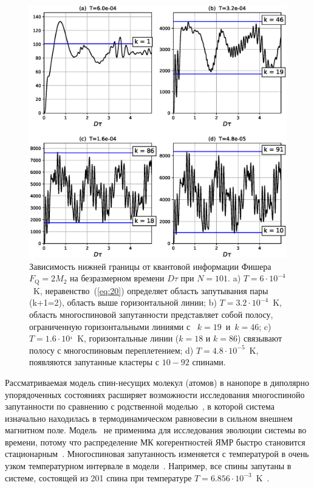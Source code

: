 \documentclass[review]{elsarticle}
\begin{document}
\begin{figure}
  	\includegraphics[width=0.95\linewidth]{fisher_low_bound_n101.eps}
	\caption{
	    Зависимость нижней границы от квантовой информации Фишера $F_\mathrm{Q} = 2 M_{2}$ 
	    на безразмерном времени $D\tau$ при $N=101$.
	    a) $T=6\cdot10^{-4}$~K, неравенство~(\ref{eq:20}) определяет область запутывания пары (k+1=2), область выше горизонтальной линии; 
	    b) $T=3.2\cdot10^{-4}$~K, область многоспиновой запутанности представляет собой полосу, ограниченную горизонтальными линиями с ~$k=19$~и~$k=46$; 
	    c) $T = 1.6\cdot10^{_4}$~K, горизонтальные линии ($k=18$ и $k=86$) связывают полосу с многоспиновым переплетением;
	    d) $T=4.8\cdot10^{-5}$~K, появляются запутанные кластеры с $10-92$ спинами.
	}
	\label{fig:2}
\end{figure}

Рассматриваемая модель спин-несущих молекул (атомов) в нанопоре в диполярно упорядоченных состояниях расширяет возможности исследования многоспинойо запутанности по сравнению с родственной моделью~\cite{Doronin_2019},
в которой система изначально находилась в термодинамическом равновесии в сильном внешнем магнитном поле.
Модель~\cite{Doronin_2019} не применима для исследования эволюции системы во времени,
потому что распределение МК когерентностей ЯМР быстро становится стационарным~\cite{Doronin_2009}.
Многоспиновая запутанность изменяется с температурой в очень узком температурном интервале в модели~\cite{Doronin_2019}.
Например, все спины запутаны в системе, состоящей из 201 спина при температуре $T=6.856\cdot10^{-3}$~K~\cite{Doronin_2019}.
\end{document}
